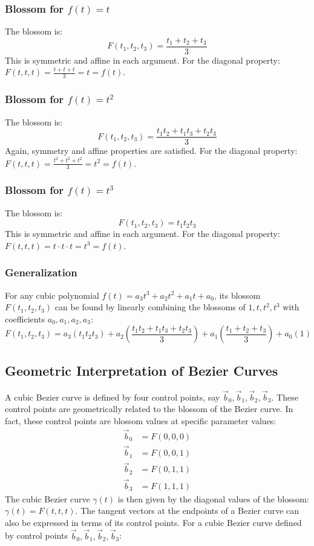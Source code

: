 \documentclass{article}
\begin{document}
\subsubsection{Blossom for \(f(t) = t\)}
The blossom is:
\[ F(t_1, t_2, t_3) = \frac{t_1 + t_2 + t_3}{3} \]
This is symmetric and affine in each argument. For the diagonal property: \(F(t, t, t) = \frac{t + t + t}{3} = t = f(t)\).

\subsubsection{Blossom for \(f(t) = t^2\)}
The blossom is:
\[ F(t_1, t_2, t_3) = \frac{t_1 t_2 + t_1 t_3 + t_2 t_3}{3} \]
Again, symmetry and affine properties are satisfied. For the diagonal property: \(F(t, t, t) = \frac{t^2 + t^2 + t^2}{3} = t^2 = f(t)\).

\subsubsection{Blossom for \(f(t) = t^3\)}
The blossom is:
\[ F(t_1, t_2, t_3) = t_1 t_2 t_3 \]
This is symmetric and affine in each argument. For the diagonal property: \(F(t, t, t) = t \cdot t \cdot t = t^3 = f(t)\).

\subsubsection{Generalization}
For any cubic polynomial \(f(t) = a_3 t^3 + a_2 t^2 + a_1 t + a_0\), its blossom \(F(t_1, t_2, t_3)\) can be found by linearly combining the blossoms of \(1, t, t^2, t^3\) with coefficients \(a_0, a_1, a_2, a_3\):
\[ F(t_1, t_2, t_3) = a_3 (t_1 t_2 t_3) + a_2 \left( \frac{t_1 t_2 + t_1 t_3 + t_2 t_3}{3} \right) + a_1 \left( \frac{t_1 + t_2 + t_3}{3} \right) + a_0 (1) \]

\subsection{Geometric Interpretation of Bezier Curves}

A cubic Bezier curve is defined by four control points, say \(\vec{b}_0, \vec{b}_1, \vec{b}_2, \vec{b}_3\). These control points are geometrically related to the blossom of the Bezier curve.  In fact, these control points are blossom values at specific parameter values:
\begin{align*}
\vec{b}_0 &= F(0, 0, 0) \\
\vec{b}_1 &= F(0, 0, 1) \\
\vec{b}_2 &= F(0, 1, 1) \\
\vec{b}_3 &= F(1, 1, 1)
\end{align*}
The cubic Bezier curve \(\gamma(t)\) is then given by the diagonal values of the blossom: \(\gamma(t) = F(t, t, t)\).
The tangent vectors at the endpoints of a Bezier curve can also be expressed in terms of its control points. For a cubic Bezier curve defined by control points \(\vec{b}_0, \vec{b}_1, \vec{b}_2, \vec{b}_3\):
\end{document}
